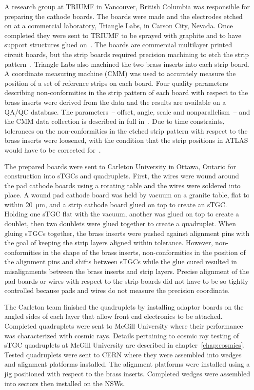 A research group at TRIUMF in Vancouver, British Columbia was responsible for preparing the cathode boards. The boards were made and the electrodes etched on at a commercial laboratory, Triangle Labs, in Carson City, Nevada. Once completed they were sent to TRIUMF to be sprayed with graphite and to have support structures glued on~\cite{carlson_results_2019}. The boards are commercial multilayer printed circuit boards, but the strip boards required precision machining to etch the strip pattern~\cite{nsw_tdr}. Triangle Labs also machined the two brass inserts into each strip board. A coordinate measuring machine (CMM) was used to accurately measure the position of a set of reference strips on each board. Four quality parameters describing non-conformities in the strip pattern of each board with respect to the brass inserts were derived from the data and the results are available on a QA/QC database. The parameters~-- offset, angle, scale and nonparallelism~-- and the CMM data collection is described in full in~\cite{carlson_results_2019}.  Due to time constraints, tolerances on the non-conformities in the etched strip pattern with respect to the brass inserts were loosened, with the condition that the strip positions in ATLAS would have to be corrected for~\cite{carlson_results_2019}. 

The prepared boards were sent to Carleton University in Ottawa, Ontario for construction into sTGCs and quadruplets. First, the wires were wound around the pad cathode boards using a rotating table and the wires were soldered into place. A wound pad cathode board was held by vacuum on a granite table, flat to within \SI{20}{\micro\meter}, and a strip cathode board glued on top to create an sTGC. Holding one sTGC flat with the vacuum, another was glued on top to create a doublet, then two doublets were glued together to create a quadruplet. When gluing sTGCs together, the brass inserts were pushed against alignment pins with the goal of keeping the strip layers aligned within tolerance. However, non-conformities in the shape of the brass inserts, non-conformities in the position of the alignment pins and shifts between sTGCs while the glue cured resulted in misalignments between the brass inserts and strip layers. Precise alignment of the pad boards or wires with respect to the strip boards did not have to be so tightly controlled because pads and wires do not measure the precision coordinate. 

The Carleton team finished the quadruplets by installing adaptor boards on the angled sides of each layer that allow front end electronics to be attached. Completed quadruplets were sent to McGill University where their performance was characterized with cosmic rays. Details pertaining to cosmic ray testing of sTGC quadruplets at McGill University are described in chapter~\ref{chap:cosmics}. Tested quadruplets were sent to CERN where they were assembled into wedges and alignment platforms installed. The alignment platforms were installed using a jig positioned with respect to the brass inserts. Completed wedges were assembled into sectors then installed on the NSWs.

